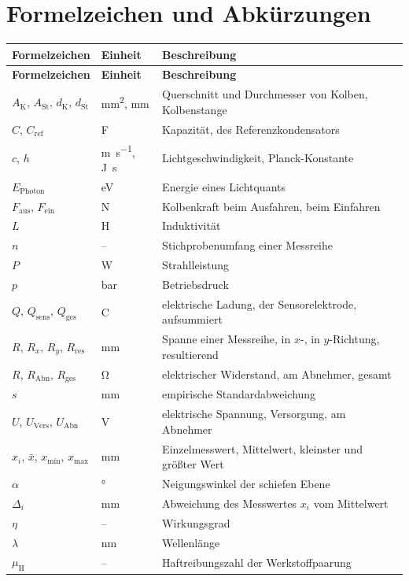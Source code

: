 \section{Formelzeichen und Abkürzungen}

{\small
\begin{xltabular}{15.1cm}{llX}
	\textbf{Formelzeichen} & \textbf{Einheit} & \textbf{Beschreibung} \\
	\hline
	\endfirsthead
	\textbf{Formelzeichen} & \textbf{Einheit} & \textbf{Beschreibung} \\
	\hline
	\endhead
	$A_\mathrm{K}$, $A_\mathrm{St}$, $d_\mathrm{K}$, $d_\mathrm{St}$ & \unit{\square\milli\metre}, \unit{\milli\metre} & Querschnitt und Durchmesser von Kolben, Kolbenstange \bigstrut[t] \\
	$C$, $C_\mathrm{ref}$ & \unit{\farad} & Kapazität, des Referenzkondensators \\
	$c$, $h$ & \unit{\metre\per\second}, \unit{\joule\second} & Lichtgeschwindigkeit, Planck-Konstante \\
	$E_\mathrm{Photon}$ & \unit{\electronvolt} & Energie eines Lichtquants \\
	$F_\mathrm{aus}$, $F_\mathrm{ein}$ & \unit{\newton} & Kolbenkraft beim Ausfahren, beim Einfahren \\
	$L$ & \unit{\henry} & Induktivität \\
	$n$ & -- & Stichprobenumfang einer Messreihe \\
	$P$ & \unit{\watt} & Strahlleistung\\
	$p$ & \unit{\bar} & Betriebsdruck \\
	$Q$, $Q_\mathrm{sens}$, $Q_\mathrm{ges}$ & \unit{\coulomb} & elektrische Ladung, der Sensorelektrode, aufsummiert \\
	$R$, $R_x$, $R_y$, $R_\mathrm{res}$ & \unit{\milli\metre} & Spanne einer Messreihe, in $x$-, in $y$-Richtung, resultierend \\
	$R$, $R_\mathrm{Abn}$, $R_\mathrm{ges}$ & \unit{\ohm} & elektrischer Widerstand, am Abnehmer, gesamt \\
	$s$ & \unit{\milli\metre} & empirische Standardabweichung \\
	$U$, $U_\mathrm{Vers}$, $U_\mathrm{Abn}$ & \unit{\volt} & elektrische Spannung, Versorgung, am Abnehmer\\
	$x_i$, $\bar{x}$, $x_{\min}$, $x_{\max}$ & \unit{\milli\metre} & Einzelmesswert, Mittelwert, kleinster und größter Wert \\
	$\alpha$ & \unit{\degree} & Neigungswinkel der schiefen Ebene \\
	$\Delta_i$ & \unit{\milli\metre} & Abweichung des Messwertes $x_i$ vom Mittelwert \\
	$\eta$ & -- & Wirkungsgrad \\
	$\lambda$ & \unit{\nano\metre} & Wellenlänge \\
	$\mu_\mathrm{H}$ & -- & Haftreibungszahl der Werkstoffpaarung \bigstrut[b] \\
\end{xltabular}

}
